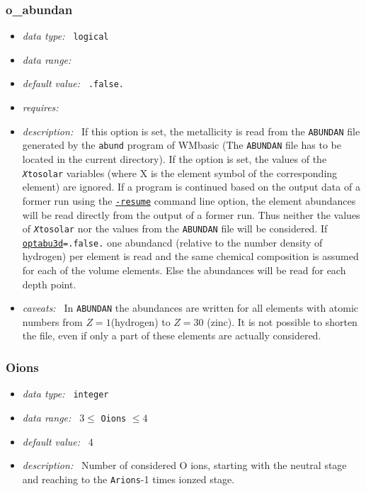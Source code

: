 \documentclass[a4paper,10pt]{article}
\begin{document}
\subsubsection{o\_abundan}
\label{opt:oabundan}
\begin{itemize}
 \item \textit{data type:~} \texttt{logical}
 \item \textit{data range:~}
 \item \textit{default value:~} \texttt{.false.}
 \item \textit{requires:~}
 \item \textit{description:~} If this option is set, the metallicity is read 
  from the \texttt{ABUNDAN} file generated by the \texttt{abund} program of 
  WMbasic (The \texttt{ABUNDAN} file has to be located in the current 
  directory). If the option is set, the values of the 
  \texttt{\textit{X}tosolar} variables (where X is the element symbol of the 
  corresponding element) are ignored. If a program is continued based on the 
  output data of a former run using the 
  \texttt{\hyperref[sec:commandlineoptions]{-resume}} command   line option, 
  the element abundances will be read directly from the output of   a former 
  run. Thus neither the values of \texttt{\textit{X}tosolar} nor the   values 
  from the \texttt{ABUNDAN} file will be considered. If 
  \texttt{\hyperref[opt:optabu3d]{optabu3d}=.false.} one abundancd (relative to 
  the number density of hydrogen) per element is read and the same 
  chemical composition is assumed for each of the volume elements. Else 
  the abundances will be read for each depth point. 
 \item \textit{caveats:~} In \texttt{ABUNDAN} the abundances are written for all
  elements with atomic numbers from $Z=1$(hydrogen) to $Z=30$ (zinc). It is not 
  possible to shorten the file, even if only a part of these elements are 
  actually considered. 
\end{itemize}


\subsubsection{Oions}
\label{opt:oions}
\begin{itemize}
 \item \textit{data type:~} \texttt{integer}
 \item \textit{data range:~}  $3 \leq$ \texttt{Oions} $\leq 4$ 
 \item \textit{default value:~} 4
 \item \textit{description:~} Number of considered O ions, starting with the 
 neutral stage and reaching to  the \texttt{Arions}-1 times ionzed stage.
\end{itemize}
\end{document}
